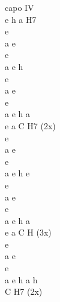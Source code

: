 \begin{chord}
\vin capo IV\\
\vin e h a H7\\
e\\
a e\\
e\\
a e h\\

\vin e\\
\vin a e\\
\vin e\\
\vin a e h a\\
e a C H7 (2x)\\

e\\
a e\\
e\\
a e h e\\

\vin e\\
\vin a e\\
\vin e\\
\vin a e h a\\
e a C H (3x)\\

\vin e\\
\vin a e\\
\vin e\\
\vin a e h a h \\
C H7 (2x)\\
\end{chord}
